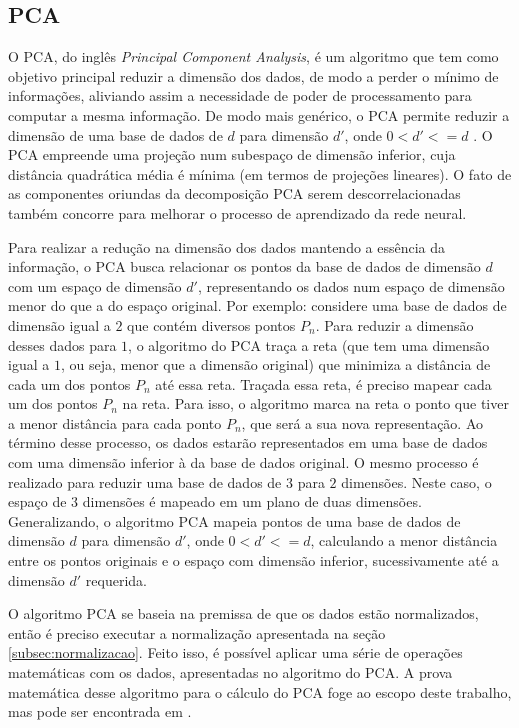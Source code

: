 \subsection{PCA}

O PCA, do inglês \textit{Principal Component Analysis}, é um algoritmo que tem como objetivo principal reduzir a dimensão dos dados, de modo a perder o mínimo de informações, aliviando assim a necessidade de poder de processamento para computar a mesma informação. De modo mais genérico, o PCA permite reduzir a dimensão de uma base de dados de $d$ para dimensão $d'$, onde $0<d'<=d$ \cite{Jolliffe}. O PCA empreende uma projeção num subespaço de dimensão inferior, cuja distância quadrática média é mínima (em termos de projeções lineares). O fato de as componentes oriundas da decomposição PCA serem descorrelacionadas também concorre para melhorar o processo de aprendizado da rede neural.

Para realizar a redução na dimensão dos dados mantendo a essência da informação, o PCA busca relacionar os pontos da base de dados de dimensão $d$ com um espaço de dimensão $d'$, representando os dados num espaço de dimensão menor do que a do espaço original. Por exemplo: considere uma base de dados de dimensão igual a $2$ que contém diversos pontos $P_n$. Para reduzir a dimensão desses dados para $1$, o algoritmo do PCA traça a reta (que tem uma dimensão igual a $1$, ou seja, menor que a dimensão original) que minimiza a distância de cada um dos pontos $P_n$ até essa reta. Traçada essa reta, é preciso mapear cada um dos pontos $P_n$ na reta. Para isso, o algoritmo marca na reta o ponto que tiver a menor distância para cada ponto $P_n$, que será a sua nova representação. Ao término desse processo, os dados estarão representados em uma base de dados com uma dimensão inferior à da base de dados original. O mesmo processo é realizado para reduzir uma base de dados de $3$ para $2$ dimensões. Neste caso, o espaço de $3$ dimensões é mapeado em um plano de duas dimensões. Generalizando, o algoritmo PCA mapeia pontos de uma base de dados de dimensão $d$ para dimensão $d'$, onde $0<d'<=d$, calculando a menor distância entre os pontos originais e o espaço com dimensão inferior, sucessivamente até a dimensão $d'$ requerida. 

O algoritmo PCA se baseia na premissa de que os dados estão normalizados, então é preciso executar a normalização apresentada na seção \ref{subsec:normalizacao}. Feito isso, é possível aplicar uma série de operações matemáticas com os dados, apresentadas no algoritmo do PCA. A prova matemática desse algoritmo para o cálculo do PCA foge ao escopo deste trabalho, mas pode ser encontrada em \cite{Jolliffe}.

